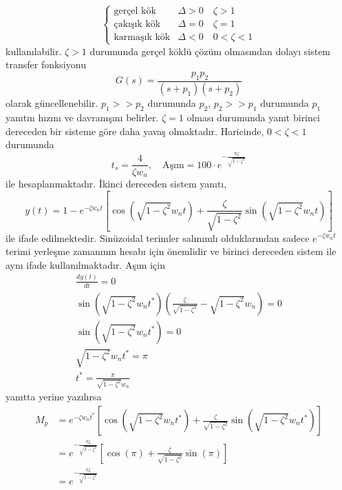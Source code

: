 \begin{equation}
    \begin{cases}
        \text{gerçel kök}& \Delta>0\quad \zeta>1\\
        \text{çakışık kök}& \Delta=0\quad \zeta=1\\
        \text{karmaşık kök}& \Delta<0\quad 0<\zeta<1
    \end{cases}
\end{equation}
kullanılabilir. $\zeta>1$ durumunda gerçel köklü çözüm olmasından dolayı sistem transfer fonksiyonu
\begin{equation}
    G(s)=\frac{p_1 p_2}{(s+p_1)(s+p_2)}
\end{equation}
olarak güncellenebilir. $p_1>>p_2$ durumunda $p_2$, $p_2>>p_1$ durumunda $p_1$ yanıtın hızını ve davranışını belirler. $\zeta=1$ olması durumunda yanıt birinci dereceden bir sisteme göre daha yavaş olmaktadır. Haricinde, $0<\zeta<1$ durumunda 
\begin{equation} 
    t_s=\frac{4}{\zeta w_n},\quad \text{Aşım}=100\cdot e^{-\frac{\pi\zeta }{\sqrt{1-\zeta^2}}}
\end{equation} 
ile hesaplanmaktadır. İkinci dereceden sistem yanıtı,
\begin{equation}
    y(t)=1-e^{-\zeta w_nt}\left[\cos(\sqrt{1-\zeta^2}w_nt)+\frac{\zeta}{\sqrt{1-\zeta^2}}\sin(\sqrt{1-\zeta^2}w_nt)\right]
\end{equation}
ile ifade edilmektedir. Sinüzoidal terimler salınımlı olduklarından sadece $e^{-\zeta w_nt}$ terimi yerleşme zamanının hesabı için önemlidir ve birinci dereceden sistem ile aynı ifade kullanılmaktadır. Aşım için 
\begin{equation}
\begin{split}
    \frac{dy(t)}{dt}=0\\
    \sin(\sqrt{1-\zeta^2}w_nt^*)(\frac{\zeta}{\sqrt{1-\zeta^2}}-\sqrt{1-\zeta^2}w_n)=0\\
    \sin(\sqrt{1-\zeta^2}w_nt^*)=0\\
    \sqrt{1-\zeta^2}w_nt^*=\pi\\
    t^*=\frac{\pi}{\sqrt{1-\zeta^2}w_n}
\end{split}
\end{equation}
yanıtta yerine yazılırsa
\begin{equation}
    \begin{split}
        M_p&=e^{-\zeta w_nt^*}\left[\cos(\sqrt{1-\zeta^2}w_nt^*)+\frac{\zeta}{\sqrt{1-\zeta^2}}\sin(\sqrt{1-\zeta^2}w_nt^*)\right]\\
        &=e^{-\frac{\pi\zeta }{\sqrt{1-\zeta^2}}}\left[\cos(\pi)+\frac{\zeta}{\sqrt{1-\zeta^2}}\sin(\pi)\right]\\
        &=e^{-\frac{\pi\zeta }{\sqrt{1-\zeta^2}}}
    \end{split}
\end{equation}

